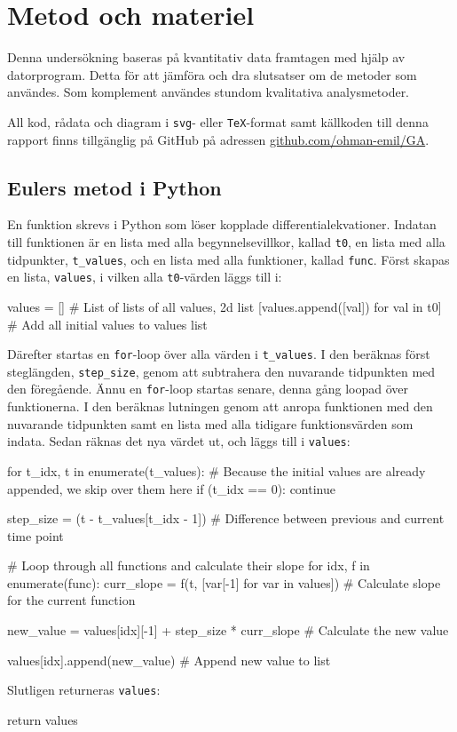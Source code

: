 \section{Metod och materiel}
Denna undersökning baseras på kvantitativ data framtagen med hjälp av datorprogram. Detta för att jämföra och dra slutsatser om de metoder som användes. Som komplement användes stundom kvalitativa analysmetoder.

All kod, rådata och diagram i \texttt{svg}- eller \texttt{TeX}-format samt källkoden till denna rapport finns tillgänglig på GitHub på adressen \href{http://github.com/ohman-emil/GA}{github.com/ohman-emil/GA}. %

\subsection{Eulers metod i Python}
En funktion skrevs i Python som löser kopplade differentialekvationer. Indatan till funktionen är en lista med alla begynnelsevillkor, kallad \texttt{t0}, en lista med alla tidpunkter, \texttt{t\_values}, och en lista med alla funktioner, kallad \texttt{func}. Först skapas en lista, \texttt{values}, i vilken alla \texttt{t0}-värden läggs till i:
\begin{pycode}
values = [] # List of lists of all values, 2d list
[values.append([val]) for val in t0] # Add all initial values to values list
\end{pycode}
Därefter startas en \texttt{for}-loop över alla värden i \texttt{t\_values}. I den beräknas först steglängden, \texttt{step\_size}, genom att subtrahera den nuvarande tidpunkten med den föregående. Ännu en \texttt{for}-loop startas senare, denna gång loopad över funktionerna. I den beräknas lutningen genom att anropa funktionen med den nuvarande tidpunkten samt en lista med alla tidigare funktionsvärden som indata. Sedan räknas det nya värdet ut, och läggs till i \texttt{values}:
\begin{pycode}
for t_idx, t in enumerate(t_values):
    # Because the initial values are already appended, we skip over them here
    if (t_idx == 0): continue

    step_size = (t - t_values[t_idx - 1]) # Difference between previous and current time point

    # Loop through all functions and calculate their slope
    for idx, f in enumerate(func):
        curr_slope = f(t, [var[-1] for var in values]) # Calculate slope for the current function

        new_value = values[idx][-1] + step_size * curr_slope # Calculate the new value

        values[idx].append(new_value) # Append new value to list
\end{pycode}
Slutligen returneras \texttt{values}:
\begin{pycode}
return values
\end{pycode}

